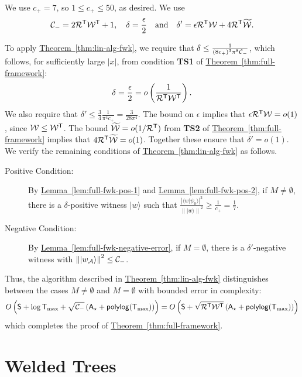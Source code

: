 \documentclass{theoretics}
\newcommand{\thm}[1]{\hyperref[thm:#1]{Theorem~\ref*{thm:#1}}}
\newcommand{\lem}[1]{\hyperref[lem:#1]{Lemma~\ref*{lem:#1}}}
\def\ket#1{{\lvert}#1\rangle}
\renewcommand{\>}{\rangle}
\newcommand{\<}{\langle}
\renewcommand{\(}{\left(}
\renewcommand{\)}{\right)}
\def\braket#1#2{{{\langle}#1\vert}#2\rangle}
\def\norm#1{\left\| #1 \right\|}
\begin{document}
We use $c_+=7$, so $1\leq c_+\leq 50$, as desired. We use  
\begin{equation*}
{\cal C}_-=2{\cal R}^{\sf T}{\cal W}^{\sf T}+1,
\quad
\delta = \frac{\epsilon}{2}
\quad\mbox{and}\quad
\delta' = \epsilon {\cal R}^{\sf T}{\cal W}+4{\cal R}^{\sf T}\widetilde{\cal W}.
\end{equation*}

To apply \thm{lin-alg-fwk}, we require that $\delta\leq \frac{1}{(8c_+)^{3}\pi^8{{\cal C}_-}}$, which follows, for sufficiently large $|x|$, from condition \textbf{TS1} of \thm{full-framework}:
\begin{align*}
\delta = \frac{\epsilon}{2}=o\left(\frac{1}{{\cal R}^{\sf T}{\cal W}^{\sf T}}\right).
\end{align*}
We also require that $\delta'\leq \frac{3}{4}\frac{1}{\pi^4c_+}=\frac{3}{28\pi^4}$. The bound on $\epsilon$ implies that $\epsilon {\cal R}^{\sf T}{\cal W} = o(1)$, since ${\cal W}\leq {\cal W}^{\sf T}$. The bound $\widetilde{\cal W}=o(1/{\cal R}^{\sf T})$ from \textbf{TS2} of \thm{full-framework} implies that $4{\cal R}^{\sf T}\widetilde{\cal W}=o(1)$. 
Together these ensure that $\delta'=o(1)$.  
We verify the remaining conditions of \thm{lin-alg-fwk} as follows.
\begin{description}
\item[Positive Condition:] By \lem{full-fwk-pos-1} and \lem{full-fwk-pos-2}, if $M\neq \emptyset$, there is a $\delta$-positive witness $\ket{w}$ such that $\frac{|\braket{w}{\psi_0}|^2}{\norm{\ket{w}}^2}\geq \frac{1}{c_+}=\frac{1}{7}$. 
\item[Negative Condition:] By \lem{full-fwk-negative-error}, if $M=\emptyset$, there is a $\delta'$-negative witness with $\norm{\ket{w_{\cal A}}}^2\leq {\cal C}_-$. 
\end{description}

\noindent Thus, the algorithm described in \thm{lin-alg-fwk} distinguishes between the cases $M\neq \emptyset$ and $M=\emptyset$ with bounded error in complexity:
$$O\left({\sf S}+\log{\sf T}_{\max}+\sqrt{{\cal C}_-}\left({\sf A}_\star+{\sf polylog}({\sf T}_{\max})\right)\right)=O\left({\sf S}+\sqrt{{\cal R}^{\sf T}{\cal W}^{\sf T}}\left({\sf A}_\star+{\sf polylog}({\sf T}_{\max})\right)\right)$$
which completes the proof of \thm{full-framework}.




\section{Welded Trees}\label{sec:welded}
\end{document}
